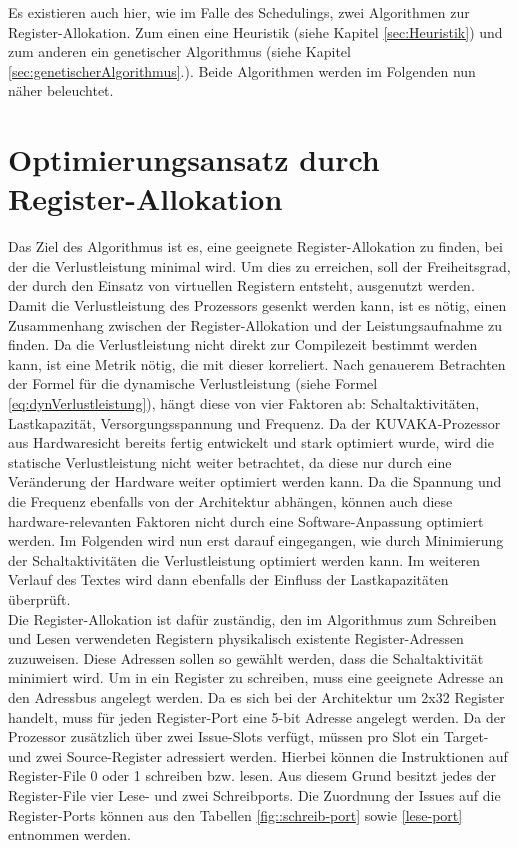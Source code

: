 \begin{itemize}
		Es existieren auch hier, wie im Falle des Schedulings, zwei Algorithmen zur Register-Allokation. Zum einen eine Heuristik (siehe Kapitel \ref{sec:Heuristik}) und zum anderen ein genetischer Algorithmus (siehe Kapitel \ref{sec:genetischerAlgorithmus}.). Beide Algorithmen werden im Folgenden nun näher beleuchtet.
\end{itemize}


\section{Optimierungsansatz durch Register-Allokation}
\label{chap:ansatz}
Das Ziel des Algorithmus ist es, eine geeignete Register-Allokation zu finden, bei der die Verlustleistung minimal wird. Um dies zu erreichen, soll der Freiheitsgrad, der durch den Einsatz von virtuellen Registern entsteht, ausgenutzt werden.
Damit die Verlustleistung des Prozessors gesenkt werden kann, ist es nötig, einen Zusammenhang zwischen der Register-Allokation und der Leistungsaufnahme zu finden. Da die Verlustleistung nicht direkt zur Compilezeit bestimmt werden kann, ist eine Metrik nötig, die mit dieser korreliert.
Nach genauerem Betrachten der Formel für die dynamische Verlustleistung (siehe Formel \ref{eq:dynVerlustleistung}), hängt diese von vier Faktoren ab: Schaltaktivitäten,  Lastkapazität, Versorgungsspannung und Frequenz. Da der KUVAKA-Prozessor aus Hardwaresicht bereits fertig entwickelt und stark optimiert wurde, wird die statische Verlustleistung nicht weiter betrachtet, da diese  nur durch eine Veränderung der Hardware weiter optimiert werden kann. Da die Spannung und die Frequenz ebenfalls von der Architektur abhängen, können auch diese hardware-relevanten Faktoren nicht durch eine Software-Anpassung optimiert werden. Im Folgenden wird nun erst darauf eingegangen, wie durch Minimierung der Schaltaktivitäten die Verlustleistung optimiert werden kann. Im weiteren Verlauf des Textes wird dann ebenfalls der Einfluss der Lastkapazitäten überprüft.\\
Die Register-Allokation ist dafür zuständig, den im Algorithmus zum Schreiben und Lesen verwendeten Registern physikalisch existente Register-Adressen zuzuweisen. Diese Adressen sollen so gewählt werden, dass die Schaltaktivität minimiert wird.
Um in ein Register zu schreiben, muss eine geeignete Adresse an den Adressbus angelegt werden. Da es sich bei der Architektur um 2x32 Register handelt, muss für jeden Register-Port eine 5-bit Adresse angelegt werden.
Da der Prozessor zusätzlich über zwei Issue-Slots verfügt, müssen pro Slot ein Target- und zwei Source-Register adressiert werden. Hierbei können die Instruktionen auf Register-File 0 oder 1 schreiben bzw. lesen. Aus diesem Grund besitzt jedes der Register-File vier Lese- und zwei Schreibports. Die Zuordnung der Issues auf die Register-Ports können aus den Tabellen \ref{fig::schreib-port} sowie \ref{lese-port} entnommen werden.\\
